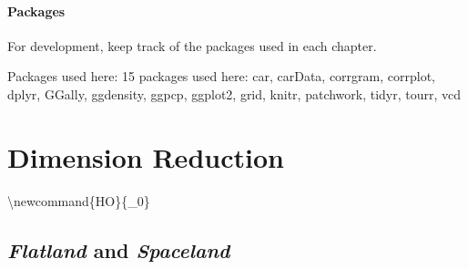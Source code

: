 \documentclass[
  letterpaper,
  10pt,
  krantz2]{krantz}
\begin{document}
{\subsubsection*{Packages}\label{packages}

For development, keep track of the packages used in each chapter.

Packages used here: 15 packages used here: car, carData, corrgram,
corrplot, dplyr, GGally, ggdensity, ggpcp, ggplot2, grid, knitr,
patchwork, tidyr, tourr, vcd


\chapter{Dimension Reduction}\label{sec-pca-biplot}

\renewcommand*{\vec}[1]{\mathbf{#1}}
\newcommand{\trans}{^\mathsf{T}}
\newcommand*{\mat}[1]{\mathbf{#1}}
\newcommand*{\diag}[1]{\mathrm{diag}\, #1}

\renewcommand*{\det}[1]{\mathrm{det}(#1)}
\newcommand*{\rank}[1]{\mathrm{rank} (\mathbf{#1})}
\newcommand*{\trace}[1]{\mathrm{tr} (\mathbf{#1})}
\newcommand*{\dev}[1]{(#1 - \bar{#1})}
\newcommand*{\inv}[1]{\mat{#1}^{-1}}
\newcommand*{\half}[1]{\mat{#1}^{1/2}}
\newcommand*{\invhalf}[1]{\mat{#1}^{-1/2}}
\newcommand*{\nvec}[2]{{#1}_{1}, {#1}_{2},\ldots,{#1}_{#2}}
\newcommand*{\Beta}{\boldsymbol{B}}
\newcommand*{\Epsilon}{\boldsymbol{\Large\varepsilon}}
\newcommand*{\period}{\:\: .}
\newcommand*{\comma}{\:\: ,}
\newcommand*{\given}{\, | \,}
\newcommand*{\Real}[1]{\mathbb{R}^{#1}}
\newcommand*{\degree}[1]{{#1}^{\circ}}

\newcommand{\sizedmat}[2]{\mathord{\mathop{\mat{#1}}\limits_{#2}}}

\renewcommand*{\H}{\mathbf{H}}               
\newcommand*{\E}{\mathbf{E}}
\newcommand*{\widebar}[1]{\overline{#1}}

\newcommand{\Var}{\mathsf{Var}}
\newcommand{\Cov}{\mathsf{Cov}}

\textbackslash newcommand\{HO\}\{\_0\}

\newcommand*{\V}{\mathcal{V}}

\newcommand{\pkg}[1]{\textsf{#1}}
\newcommand{\Rpackage}[1]{\pkg{#1} package}

\section{\texorpdfstring{\emph{Flatland} and
\emph{Spaceland}}{Flatland and Spaceland}}\label{sec-spaceland}

}
\end{document}
